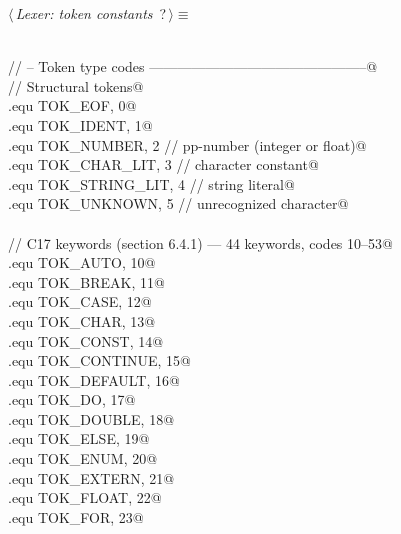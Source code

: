 \documentclass[11pt,a4paper,twoside,openright,DIV=15]{scrbook}
\theoremstyle{definition}
\theoremstyle{plain}
\theoremstyle{remark}
\begin{document}
\begin{flushleft} \small
\begin{minipage}{\linewidth}\label{scrap56}\raggedright\small
{} $\langle\,${\itshape Lexer: token constants}\nobreak\ {\footnotesize {?}}$\,\rangle\equiv$
\vspace{-1ex}
\begin{list}{}{} \item
\mbox{}\verb@@\\
\mbox{}\verb@// -- Token type codes -----------------------------------------------@\\
\mbox{}\verb@// Structural tokens@\\
\mbox{}\verb@.equ TOK_EOF,          0@\\
\mbox{}\verb@.equ TOK_IDENT,        1@\\
\mbox{}\verb@.equ TOK_NUMBER,       2      // pp-number (integer or float)@\\
\mbox{}\verb@.equ TOK_CHAR_LIT,     3      // character constant@\\
\mbox{}\verb@.equ TOK_STRING_LIT,   4      // string literal@\\
\mbox{}\verb@.equ TOK_UNKNOWN,      5      // unrecognized character@\\
\mbox{}\verb@@\\
\mbox{}\verb@// C17 keywords (section 6.4.1) — 44 keywords, codes 10–53@\\
\mbox{}\verb@.equ TOK_AUTO,        10@\\
\mbox{}\verb@.equ TOK_BREAK,       11@\\
\mbox{}\verb@.equ TOK_CASE,        12@\\
\mbox{}\verb@.equ TOK_CHAR,        13@\\
\mbox{}\verb@.equ TOK_CONST,       14@\\
\mbox{}\verb@.equ TOK_CONTINUE,    15@\\
\mbox{}\verb@.equ TOK_DEFAULT,     16@\\
\mbox{}\verb@.equ TOK_DO,          17@\\
\mbox{}\verb@.equ TOK_DOUBLE,      18@\\
\mbox{}\verb@.equ TOK_ELSE,        19@\\
\mbox{}\verb@.equ TOK_ENUM,        20@\\
\mbox{}\verb@.equ TOK_EXTERN,      21@\\
\mbox{}\verb@.equ TOK_FLOAT,       22@\\
\mbox{}\verb@.equ TOK_FOR,         23@\\

\end{list}
\end{minipage}
\end{flushleft}
\end{document}

